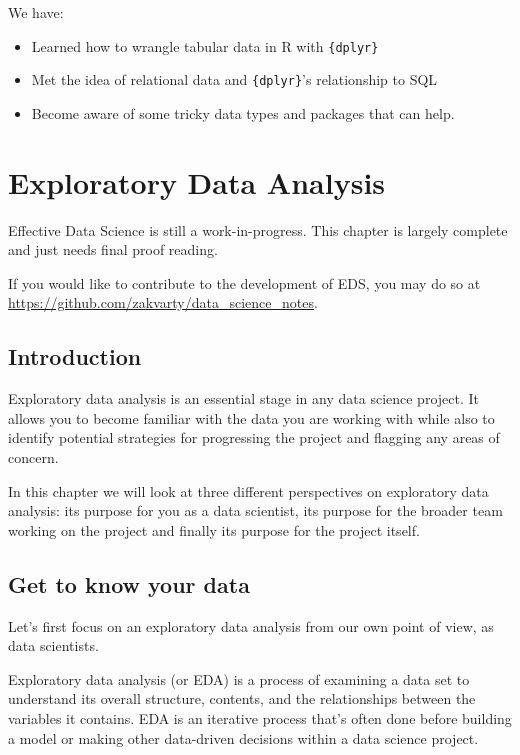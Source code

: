 \documentclass[
  12pt,
]{book}
\begin{document}
We have:

\begin{itemize}
\item
  Learned how to wrangle tabular data in R with \texttt{\{dplyr\}}
\item
  Met the idea of relational data and \texttt{\{dplyr\}}'s relationship to SQL
\item
  Become aware of some tricky data types and packages that can help.
\end{itemize}

\hypertarget{edav-analysis}{%
\chapter{Exploratory Data Analysis}\label{edav-analysis}}

Effective Data Science is still a work-in-progress. This chapter is largely complete and just needs final proof reading.

If you would like to contribute to the development of EDS, you may do so at \url{https://github.com/zakvarty/data_science_notes}.

\hypertarget{introduction-2}{%
\section{Introduction}\label{introduction-2}}

Exploratory data analysis is an essential stage in any data science project. It allows you to become familiar with the data you are working with while also to identify potential strategies for progressing the project and flagging any areas of concern.

In this chapter we will look at three different perspectives on exploratory data analysis: its purpose for you as a data scientist, its purpose for the broader team working on the project and finally its purpose for the project itself.

\hypertarget{get-to-know-your-data}{%
\section{Get to know your data}\label{get-to-know-your-data}}

Let's first focus on an exploratory data analysis from our own point of view, as data scientists.

Exploratory data analysis (or EDA) is a process of examining a data set to understand its overall structure, contents, and the relationships between the variables it contains. EDA is an iterative process that's often done before building a model or making other data-driven decisions within a data science project.
\end{document}
